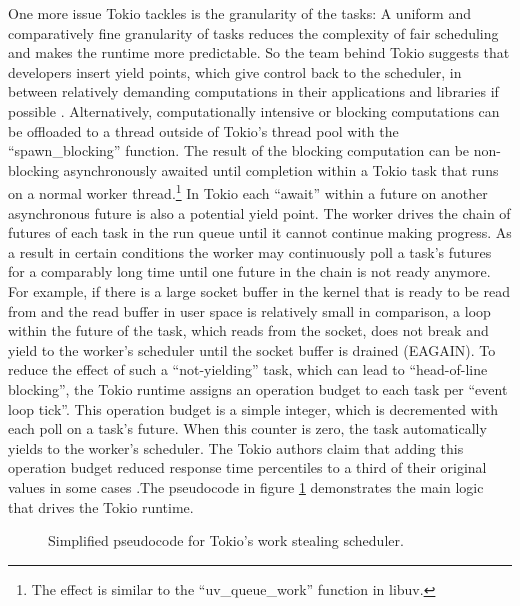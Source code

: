 One more issue Tokio tackles is the granularity of the tasks: A uniform and comparatively fine granularity of tasks reduces the complexity of fair scheduling and makes the runtime more predictable. So the team behind Tokio suggests that developers insert yield points, which give control back to the scheduler, in between relatively demanding computations in their applications and libraries if possible \cite{ryhl:async}.\newline 
Alternatively, computationally intensive or blocking computations can be offloaded to a thread outside of Tokio’s thread pool with the “spawn\_blocking” function. The result of the blocking computation can be non-blocking asynchronously awaited until completion within a Tokio task that runs on a normal worker thread.\footnote{The effect is similar to the “uv\_queue\_work” function in libuv.} \newline
In Tokio each “await” within a future on another asynchronous future is also a potential yield point. The worker drives the chain of futures of each task in the run queue until it cannot continue making progress. As a result in certain conditions the worker may continuously poll a task’s futures for a comparably long time until one future in the chain is not ready anymore. \newline
For example, if there is a large socket buffer in the kernel that is ready to be read from and the read buffer in user space is relatively small in comparison, a loop within the future of the task, which reads from the socket, does not break and yield to the worker’s scheduler until the socket buffer is drained (EAGAIN). To reduce the effect of such a “not-yielding” task, which can lead to “head-of-line blocking”, the Tokio runtime assigns an operation budget to each task per “event loop tick”. This operation budget is a simple integer, which is decremented with each poll on a task’s future. When this counter is zero, the task automatically yields to the worker’s scheduler. The Tokio authors claim that adding this operation budget reduced response time percentiles to a third of their original values in some cases \cite{lerche:preemption}.\newline The pseudocode in figure \ref{fig:tokio_code} demonstrates the main logic that drives the Tokio runtime.\newline
\begin{figure}
  \centering
  
  \caption{Simplified pseudocode for Tokio's work stealing scheduler.}
  \label{fig:tokio_code}
\end{figure}
